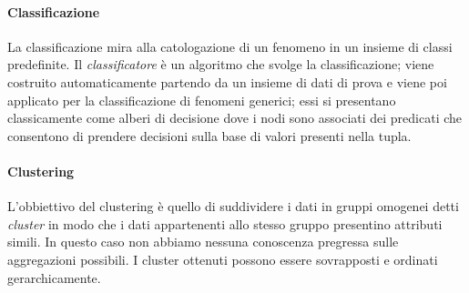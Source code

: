 \paragraph{Classificazione} La classificazione mira alla catologazione di un fenomeno in un insieme di classi predefinite. Il \emph{classificatore} è un algoritmo che svolge la classificazione; viene costruito automaticamente partendo da un insieme di dati di prova e viene poi applicato per la classificazione di fenomeni generici; essi si presentano classicamente come alberi di decisione dove i nodi sono associati dei predicati che consentono di prendere decisioni sulla base di valori presenti nella tupla.
\paragraph{Clustering} L'obbiettivo del clustering è quello di suddividere i dati in gruppi omogenei detti \emph{cluster} in modo che i dati appartenenti allo stesso gruppo presentino attributi simili. In questo caso non abbiamo nessuna conoscenza pregressa sulle aggregazioni possibili. I cluster ottenuti possono essere sovrapposti e ordinati gerarchicamente.
